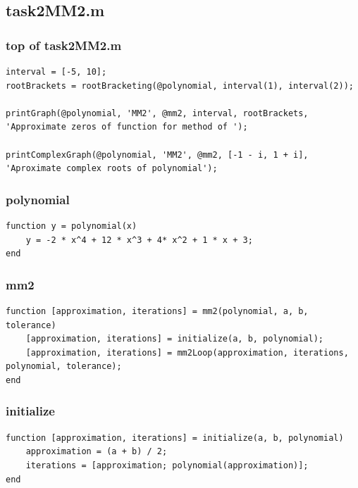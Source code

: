 \subsection{task2MM2.m}


\subsubsection{top of task2MM2.m}
\begin{simplechar}
\begin{lstlisting}
interval = [-5, 10];
rootBrackets = rootBracketing(@polynomial, interval(1), interval(2));

printGraph(@polynomial, 'MM2', @mm2, interval, rootBrackets, 'Approximate zeros of function for method of ');

printComplexGraph(@polynomial, 'MM2', @mm2, [-1 - i, 1 + i], 'Aproximate complex roots of polynomial');
\end{lstlisting}
\end{simplechar}

\subsubsection{polynomial}
\begin{simplechar}
\begin{lstlisting}
function y = polynomial(x)
    y = -2 * x^4 + 12 * x^3 + 4* x^2 + 1 * x + 3;
end

\end{lstlisting}
\end{simplechar}

\subsubsection{mm2}
\begin{simplechar}
\begin{lstlisting}
function [approximation, iterations] = mm2(polynomial, a, b, tolerance)
    [approximation, iterations] = initialize(a, b, polynomial);
    [approximation, iterations] = mm2Loop(approximation, iterations, polynomial, tolerance);
end
\end{lstlisting}
\end{simplechar}

\subsubsection{initialize}
\begin{simplechar}
\begin{lstlisting}
function [approximation, iterations] = initialize(a, b, polynomial)
    approximation = (a + b) / 2;
    iterations = [approximation; polynomial(approximation)];
end

\end{lstlisting}
\end{simplechar}

